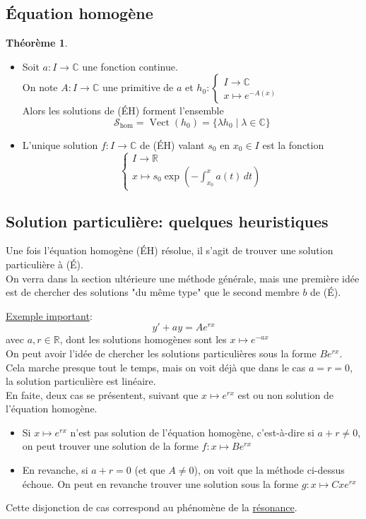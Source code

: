 \documentclass[10pt,a4paper]{article}
\theoremstyle{definition}
\newtheorem{theorem}[proposition]{Théorème}
\DeclareMathOperator{\vect}{Vect}
\begin{document}
\subsection{Équation homogène}
\begin{theorem}
\hfill
\begin{itemize}
\item Soit $a: I \to \mathbb{C}$ une fonction continue. \\
On note $A: I \to \mathbb{C}$ une primitive de $a$ et $h_0: \begin{cases}
I \to \mathbb{C} \\
x \mapsto e^{-A(x)}
\end{cases}$ \\
Alors les solutions de (ÉH) forment l'ensemble
\[ \mathcal{S}_\text{hom} = \vect(h_0) = \{ \lambda h_0 \mid \lambda \in \mathbb{C} \} \]
\item L'unique solution $f: I \to \mathbb{C}$ de (ÉH) valant $s_0$ en $x_0 \in I$ est la fonction
\[ \begin{cases}
I \to \mathbb{R} \\
x \mapsto s_0 \exp\left( - \int_{x_0}^x a(t) \, dt \right)
\end{cases} \]
\end{itemize}
\end{theorem}

\subsection{Solution particulière: quelques heuristiques}
\noindent Une fois l'équation homogène (ÉH) résolue, il s'agit de trouver une solution particulière à (É). \\
On verra dans la section ultérieure une méthode générale, mais une première idée est de chercher des solutions "du même type" que le second membre $b$ de (É). \medskip

\pagebreak

\noindent \uline{Exemple important}:
\[ y' + ay = Ae^{rx} \]
avec $a, r \in \mathbb{R}$, dont les solutions homogènes sont les $x \mapsto e^{-ax}$ \\
On peut avoir l'idée de chercher les solutions particulières sous la forme $Be^{rx}$. Cela marche presque tout le temps, mais on voit déjà que dans le cas $a = r = 0$, la solution particulière est linéaire. \\
En faite, deux cas se présentent, suivant que $x \mapsto e^{rx}$ est ou non solution de l'équation homogène.
\begin{itemize}
\item Si $x \mapsto e^{rx}$ n'est pas solution de l'équation homogène, c'est-à-dire si $a + r \neq 0$, on peut trouver une solution de la forme $f: x \mapsto Be^{rx}$
\item En revanche, si $a + r = 0$ (et que $A \neq 0$), on voit que la méthode ci-dessus échoue. On peut en revanche trouver une solution sous la forme $g: x \mapsto Cxe^{rx}$
\end{itemize}
Cette disjonction de cas correspond au phénomène de la \uline{résonance}.
\end{document}
